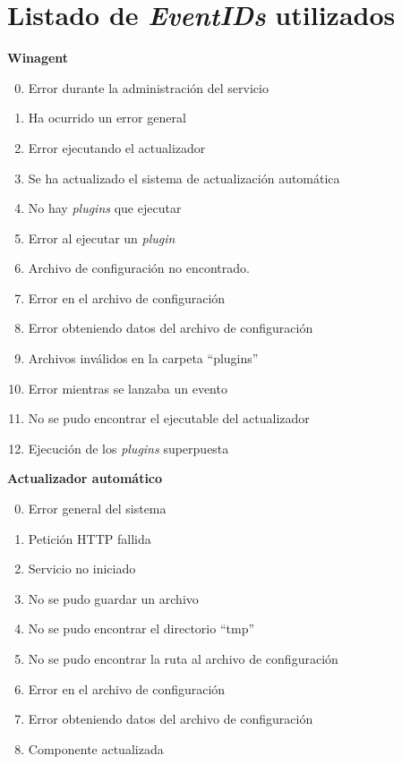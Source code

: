 \section{Listado de \textit{EventIDs} utilizados}\label{anx:eventid}
    \textbf{Winagent}
        \begin{enumerate}
            \setcounter{enumi}{-1}
            \item Error durante la administración del servicio
            \item Ha ocurrido un error general
            \item Error ejecutando el actualizador
            \item Se ha actualizado el sistema de actualización automática
            \item No hay \textit{plugins} que ejecutar
            \item Error al ejecutar un \textit{plugin}
            \item Archivo de configuración no encontrado.
            \item Error en el archivo de configuración
            \item Error obteniendo datos del archivo de configuración
            \item Archivos inválidos en la carpeta ``plugins''
            \item Error mientras se lanzaba un evento
            \item No se pudo encontrar el ejecutable del actualizador
            \item Ejecución de los \textit{plugins} superpuesta
        \end{enumerate}{}
        
        \textbf{Actualizador automático}
        \begin{enumerate}
            \setcounter{enumi}{-1}
            \item Error general del sistema
            \item Petición HTTP fallida
            \item Servicio no iniciado
            \item No se pudo guardar un archivo
            \item No se pudo encontrar el directorio ``tmp''
            \item No se pudo encontrar la ruta al archivo de configuración
            \item Error en el archivo de configuración
            \item Error obteniendo datos del archivo de configuración
            \item Componente actualizada
        \end{enumerate}{}
        
